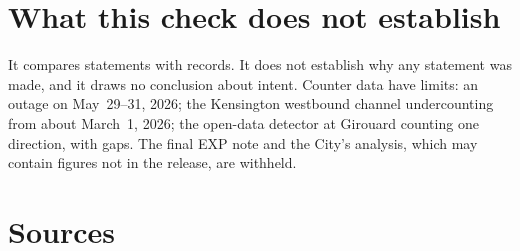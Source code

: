 \documentclass[11pt,letterpaper]{article}
\begin{document}
\section{What this check does not establish}

It compares statements with records. It does not establish why any
statement was made, and it draws no conclusion about intent. Counter data have limits: an outage on May~29--31, 2026; the Kensington
westbound channel undercounting from about March~1, 2026; the open-data
detector at Girouard counting one direction, with gaps. The final EXP note
and the City's analysis, which may contain figures not in the release, are
withheld.

\section{Sources}
\end{document}
